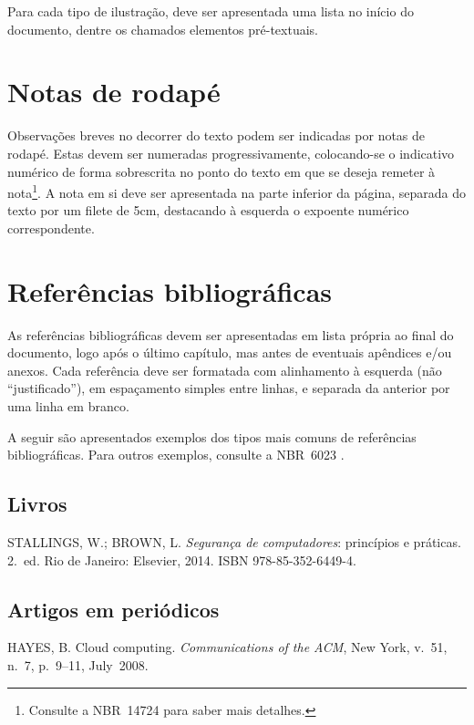 \documentclass{ifsultcc}
\begin{document}
Para cada tipo de ilustração, deve ser apresentada uma lista no início do documento, dentre os chamados elementos pré-textuais.

\section{Notas de rodapé}
Observações breves no decorrer do texto podem ser indicadas por notas de rodapé.  Estas devem ser numeradas progressivamente, colocando-se o indicativo numérico de forma sobrescrita no ponto do texto em que se deseja remeter à nota\footnote{Consulte a NBR~14724 para saber mais detalhes.}.  A nota em si deve ser apresentada na parte inferior da página, separada do texto por um filete de 5cm, destacando à esquerda o expoente numérico correspondente.

\section{Referências bibliográficas}
As referências bibliográficas devem ser apresentadas em lista própria ao final do documento, logo após o último capítulo, mas antes de eventuais apêndices e/ou anexos.  Cada referência deve ser formatada com alinhamento à esquerda (não ``justificado''), em espaçamento simples entre linhas, e separada da anterior por uma linha em branco.

A seguir são apresentados exemplos dos tipos mais comuns de referências bibliográficas.  Para outros exemplos, consulte a NBR~6023 \cite{NBR6023:2002}.

\subsection{Livros}
\begin{flushleft}
	STALLINGS, W.; BROWN, L\@. \emph{Segurança de computadores}: princípios e práticas. 2.~ed. Rio de Janeiro: Elsevier, 2014. ISBN 978-85-352-6449-4.
\end{flushleft}

\subsection{Artigos em periódicos}
\begin{flushleft}
	HAYES, B\@. Cloud computing. \emph{Communications of the ACM}, New York, v.~51, n.~7, p.~9--11, July~2008.
\end{flushleft}
\end{document}
